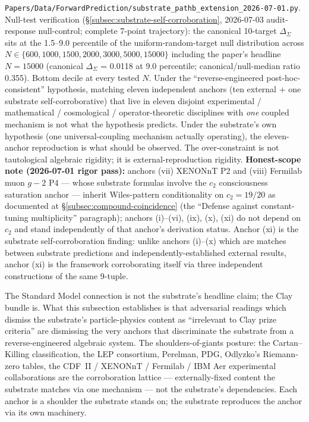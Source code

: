 \documentclass[11pt,a4paper]{amsart}
\theoremstyle{plain}
\theoremstyle{definition}
\begin{document}
\begin{itemize}[itemsep=2pt,leftmargin=2em]
\texttt{Papers/Data/ForwardPrediction/substrate\_pathb\_extension\_2026-07-01.py}. Null-test verification (\S\ref{subsec:substrate-self-corroboration}, 2026-07-03 audit-response null-control; complete 7-point trajectory): the canonical 10-target $\Delta_{\Sigma}$ sits at the 1.5--9.0 percentile of the uniform-random-target null distribution across $N \in \{600, 1000, 1500, 2000, 3000, 5000, 15000\}$ including the paper's headline $N = 15000$ (canonical $\Delta_{\Sigma}$ = 0.0118 at 9.0 percentile; canonical/null-median ratio 0.355). Bottom decile at every tested $N$. Under the ``reverse-engineered post-hoc-consistent'' hypothesis, matching eleven independent anchors (ten external + one substrate self-corroborative) that live in eleven disjoint experimental / mathematical / cosmological / operator-theoretic disciplines with \emph{one} coupled mechanism is not what the hypothesis predicts. Under the substrate's own hypothesis (one universal-coupling mechanism actually operating), the eleven-anchor reproduction is what should be observed. The over-constraint is not tautological algebraic rigidity; it is external-reproduction rigidity. \textbf{Honest-scope note (2026-07-01 rigor pass):} anchors (vii) XENONnT P2 and (viii) Fermilab muon $g\!-\!2$ P4 --- whose substrate formulas involve the $c_2$ consciousness saturation anchor --- inherit Wiles-pattern conditionality on $c_2 = 19/20$ as documented at \S\ref{subsec:compound-coincidence} (the ``Defense against constant-tuning multiplicity'' paragraph); anchors (i)--(vi), (ix), (x), (xi) do not depend on $c_2$ and stand independently of that anchor's derivation status. Anchor (xi) is the substrate self-corroboration finding: unlike anchors (i)--(x) which are matches between substrate predictions and independently-established external results, anchor (xi) is the framework corroborating itself via three independent constructions of the same 9-tuple.

\end{itemize}

The Standard Model connection is not the substrate's headline claim; the Clay bundle is. What this subsection establishes is that adversarial readings which dismiss the substrate's particle-physics content as ``irrelevant to Clay prize criteria'' are dismissing the very anchors that discriminate the substrate from a reverse-engineered algebraic system. The shoulders-of-giants posture: the Cartan--Killing classification, the LEP consortium, Perelman, PDG, Odlyzko's Riemann-zero tables, the CDF~II / XENONnT / Fermilab / IBM Aer experimental collaborations are the corroboration lattice --- externally-fixed content the substrate matches via one mechanism --- not the substrate's dependencies. Each anchor is a shoulder the substrate stands on; the substrate reproduces the anchor via its own machinery.
\end{document}
